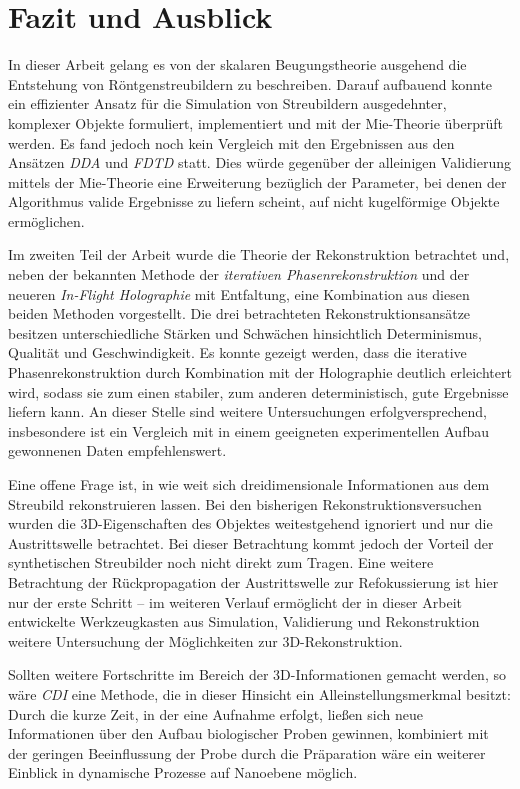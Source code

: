 \chapter{Fazit und Ausblick}
In dieser Arbeit gelang es von der skalaren Beugungstheorie ausgehend die Entstehung von Röntgenstreubildern zu beschreiben. Darauf aufbauend konnte ein effizienter Ansatz für die Simulation von Streubildern ausgedehnter, komplexer Objekte formuliert, implementiert und mit der Mie-Theorie überprüft werden. Es fand jedoch noch kein Vergleich mit den Ergebnissen aus den Ansätzen \textit{DDA} und \textit{FDTD} statt. Dies würde gegenüber der alleinigen Validierung mittels der Mie-Theorie eine Erweiterung bezüglich der Parameter, bei denen der Algorithmus valide Ergebnisse zu liefern scheint, auf nicht kugelförmige Objekte ermöglichen. 

Im zweiten Teil der Arbeit wurde die Theorie der Rekonstruktion betrachtet und, neben der bekannten Methode der \textit{iterativen Phasenrekonstruktion} und der neueren \textit{In-Flight Holographie} mit Entfaltung, eine Kombination aus diesen beiden Methoden vorgestellt. Die drei betrachteten Rekonstruktionsansätze besitzen unterschiedliche Stärken und Schwächen hinsichtlich Determinismus, Qualität und Geschwindigkeit. Es konnte gezeigt werden, dass die iterative Phasenrekonstruktion durch Kombination mit der Holographie deutlich erleichtert wird, sodass sie zum einen stabiler, zum anderen deterministisch, gute Ergebnisse liefern kann. An dieser Stelle sind weitere Untersuchungen erfolgversprechend, insbesondere ist ein Vergleich mit in einem geeigneten experimentellen Aufbau gewonnenen Daten empfehlenswert.

Eine offene Frage ist, in wie weit sich dreidimensionale Informationen aus dem Streubild rekonstruieren lassen. Bei den bisherigen Rekonstruktionsversuchen wurden die 3D-Eigenschaften des Objektes weitestgehend ignoriert und nur die Austrittswelle betrachtet. Bei dieser Betrachtung kommt jedoch der Vorteil der synthetischen Streubilder noch nicht direkt zum Tragen. Eine weitere Betrachtung der Rückpropagation der Austrittswelle zur Refokussierung ist hier nur der erste Schritt -- im weiteren Verlauf ermöglicht der in dieser Arbeit entwickelte Werkzeugkasten aus Simulation, Validierung und Rekonstruktion weitere Untersuchung der Möglichkeiten zur 3D-Rekonstruktion. 

Sollten weitere Fortschritte im Bereich der 3D-Informationen gemacht werden, so wäre \textit{CDI} eine Methode, die in dieser Hinsicht ein Alleinstellungsmerkmal besitzt: Durch die kurze Zeit, in der eine Aufnahme erfolgt, ließen sich neue Informationen über den Aufbau biologischer Proben gewinnen, kombiniert mit der geringen Beeinflussung der Probe durch die Präparation wäre ein weiterer Einblick in dynamische Prozesse auf Nanoebene möglich. 